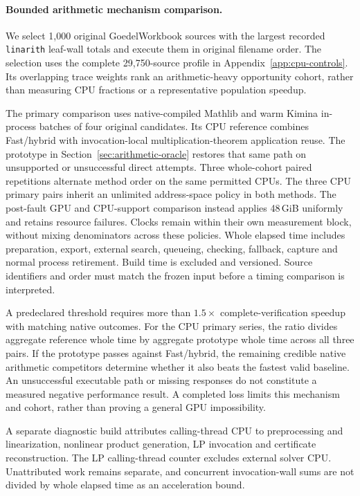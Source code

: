 \documentclass[10pt,twocolumn]{article}
\begin{document}
\paragraph{Bounded arithmetic mechanism comparison.}
We select 1,000 original GoedelWorkbook sources with the largest recorded
\texttt{linarith} leaf-wall totals and execute them in original filename
order. The selection uses the complete 29,750-source profile in
Appendix~\ref{app:cpu-controls}. Its overlapping trace weights rank an
arithmetic-heavy opportunity cohort, rather than measuring CPU fractions
or a representative population speedup.

The primary comparison uses native-compiled Mathlib and warm Kimina
in-process batches of four original candidates. Its CPU reference combines
Fast/hybrid with invocation-local multiplication-theorem application reuse.
The prototype in Section~\ref{sec:arithmetic-oracle} restores that same path
on unsupported or unsuccessful direct attempts. Three whole-cohort paired
repetitions alternate method order on the same permitted CPUs.
The three CPU primary pairs inherit an unlimited address-space policy in both
methods. The post-fault GPU and CPU-support comparison instead applies 48\,GiB
uniformly and retains resource failures. Clocks remain within their own
measurement block, without mixing denominators across these policies.
Whole elapsed time includes preparation, export, external search, queueing,
checking, fallback, capture and normal process retirement. Build time is
excluded and versioned. Source identifiers and order must match the frozen
input before a timing comparison is interpreted.

A predeclared threshold requires more than $1.5\times$ complete-verification
speedup with matching native outcomes. For the CPU primary series, the ratio divides aggregate reference whole
time by aggregate prototype whole time across all three pairs. If the prototype passes against Fast/hybrid, the remaining credible
native arithmetic competitors determine whether it also beats the fastest
valid baseline. An unsuccessful executable path or missing responses do not
constitute a measured negative performance result. A completed loss limits
this mechanism and cohort, rather than proving a general GPU impossibility.

A separate diagnostic build attributes calling-thread CPU to preprocessing
and linearization, nonlinear product generation, LP invocation and certificate
reconstruction. The LP calling-thread counter excludes external solver CPU.
Unattributed work remains separate, and concurrent invocation-wall sums are
not divided by whole elapsed time as an acceleration bound.
\end{document}
